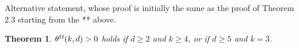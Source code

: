 \documentclass{article}
\newtheorem{theorem}{Theorem}[section]
\newtheorem{lemma}[theorem]{Lemma}
\theoremstyle{definition}
\newcommand{\1}{\mathbbm{1}}
\newcommand{\0}{\mathbf{o}}
\newcommand{\Z}{\mathbb{Z}}
\begin{document}


\color{green} Alternative statement, whose proof is initially the same as the proof of Theorem 2.3 starting from the ** above. \color{black}

\begin{theorem}\label{thm-CoxDurrett}
$\theta^{\rm D}(k,d)>0$ holds if $d \geq 2$ and $k \geq 4$, or if $d \geq 5$ and $k=3$. 
\end{theorem}
\end{document}
